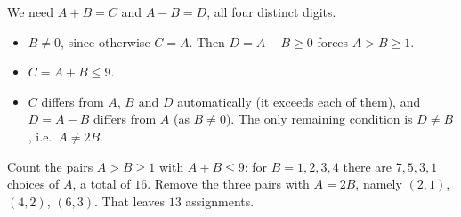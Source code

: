 We need $A+B=C$ and $A-B=D$, all four distinct digits.
\begin{itemize}
\item $B\ne0$, since otherwise $C=A$. Then $D=A-B\ge0$ forces $A>B\ge1$.
\item $C=A+B\le9$.
\item $C$ differs from $A$, $B$ and $D$ automatically (it exceeds each of them), and $D=A-B$ differs from $A$ (as $B\ne0$). The only remaining condition is $D\ne B$, i.e.\ $A\ne2B$.
\end{itemize}
Count the pairs $A>B\ge1$ with $A+B\le9$: for $B=1,2,3,4$ there are $7,5,3,1$ choices of $A$, a total of $16$. Remove the three pairs with $A=2B$, namely $(2,1)$, $(4,2)$, $(6,3)$. That leaves $\boxed{13}$ assignments.

